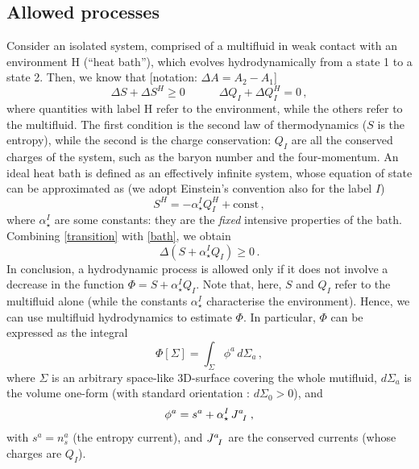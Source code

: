 \documentclass[a4paper, amsfonts, amssymb, amsmath, reprint, showkeys, nofootinbib, twoside, onecolumn,notitlepage]{revtex4-1}
\newcommand{\spc}{\quad \quad \quad}
\theoremstyle{definition}
\theoremstyle{theorem}
\begin{document}
 

\subsection{Allowed processes}\label{ALLUCE}

Consider an isolated system, comprised of a multifluid in weak contact with an environment H (``heat bath''), which evolves hydrodynamically from a state 1 to a state 2. Then, we know that [notation: $\Delta A=A_2-A_1$]
\begin{equation}\label{transition}
\Delta S+\Delta S^H \geq 0  \spc \Delta Q_I + \Delta Q_I^H =0 \, ,
\end{equation}
where quantities with label H refer to the environment, while the others refer to the multifluid. The first condition is the second law of thermodynamics ($S$ is the entropy), while the second is the charge conservation: $Q_I$ are all the conserved charges of the system, such as the baryon number and the four-momentum. An ideal heat bath is defined as an effectively infinite system, whose equation of state can be approximated as \cite{GavassinoTermometri} (we adopt Einstein's convention also for the label $I$) 
\begin{equation}\label{bath}
S^H= -\alpha^I_\star Q^H_I +\text{const} \, ,
\end{equation}
where $\alpha^I_\star$ are some constants: they are the \textit{fixed} intensive properties of the bath. Combining \eqref{transition} with \eqref{bath}, we obtain 
\begin{equation}\label{deltaallowed}
\Delta (S+\alpha^I_\star Q_I) \geq 0 \, .
\end{equation}
In conclusion, a hydrodynamic process is allowed only if it does not involve a decrease in the function $\Phi = S+\alpha^I_\star Q_I$. Note that, here, $S$ and $Q_I$ refer to the multifluid alone (while the constants $\alpha^I_\star$ characterise the environment). Hence, we can use multifluid hydrodynamics to estimate $\Phi$. In particular, $\Phi$ can be expressed as the integral
\begin{equation}\label{phiInSigma}
\Phi[\Sigma] = \int_\Sigma \phi^a \, d\Sigma_a \, ,
\end{equation}
where $\Sigma$ is an arbitrary space-like 3D-surface covering the whole mutifluid, $d\Sigma_a$ is the volume one-form (with standard orientation \cite{MTW_book}: $d\Sigma_0 >0$), and 
\begin{equation}\label{phiat}
\phi^a = s^a +\alpha^I_\star \, J\indices{^a_I} \, ,
\end{equation}
with $s^a=n_s^a$ (the entropy current), and $J\indices{^a_I}$ are the conserved currents (whose charges are $Q_I$).
\end{document}
